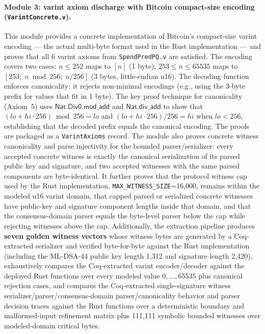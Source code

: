 \documentclass[11pt]{article}
\begin{document}
\paragraph{Module 3: varint axiom discharge with Bitcoin compact-size encoding (\texttt{VarintConcrete.v}).}
This module provides a concrete implementation of Bitcoin's compact-size varint encoding --- the actual multi-byte format used in the Rust implementation --- and proves that all 6 varint axioms from \texttt{SpendPredPQ.v} are satisfied.
The encoding covers two cases: $n \le 252$ maps to $[n]$ (1 byte); $253 \le n \le 65535$ maps to $[253;\; n \bmod 256;\; n / 256]$ (3 bytes, little-endian u16).
The decoding function enforces canonicality: it rejects non-minimal encodings (e.g., using the 3-byte prefix for values that fit in 1 byte).
The key proof technique for canonicality (Axiom~5) uses $\textsf{Nat.Div0.mod\_add}$ and $\textsf{Nat.div\_add}$ to show that $(lo + hi \cdot 256) \bmod 256 = lo$ and $(lo + hi \cdot 256) / 256 = hi$ when $lo < 256$, establishing that the decoded prefix equals the canonical encoding.
The proofs are packaged as a \texttt{VarintAxioms} record.
The module also proves concrete witness canonicality and parse injectivity for the bounded parser/serializer: every accepted concrete witness is exactly the canonical serialization of its parsed public key and signature, and two accepted witnesses with the same parsed components are byte-identical.
It further proves that the protocol witness cap used by the Rust implementation, \texttt{MAX\_WITNESS\_SIZE}=16{,}000, remains within the modeled u16 varint domain, that capped parsed or serialized concrete witnesses have public-key and signature component lengths inside that domain, and that the consensus-domain parser equals the byte-level parser below the cap while rejecting witnesses above the cap.
Additionally, the extraction pipeline produces \textbf{seven golden witness vectors} whose witness bytes are generated by a Coq-extracted serializer and verified byte-for-byte against the Rust implementation (including the ML-DSA-44 public key length 1{,}312 and signature length 2{,}420), exhaustively compares the Coq-extracted varint encoder/decoder against the deployed Rust functions over every modeled value $0,\ldots,65535$ plus canonical rejection cases, and compares the Coq-extracted single-signature witness serializer/parser/consensus-domain parser/canonicality behavior and parser decision traces against the Rust functions over a deterministic boundary and malformed-input refinement matrix plus 111{,}111 symbolic bounded witnesses over modeled-domain critical bytes.
\end{document}
